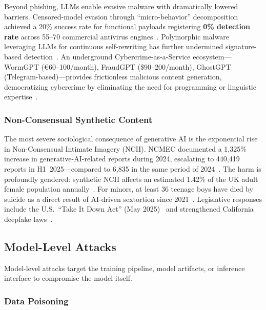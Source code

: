 Beyond phishing, LLMs enable evasive malware with dramatically lowered barriers. Censored-model evasion through ``micro-behavior'' decomposition achieved a 20\% success rate for functional payloads registering \textbf{0\% detection rate} across 55--70 commercial antivirus engines~\cite{mdpi2025malware}. Polymorphic malware leveraging LLMs for continuous self-rewriting has further undermined signature-based detection~\cite{crowdstrike2025ransomware}. An underground Cybercrime-as-a-Service ecosystem---WormGPT (\euro60--100/month), FraudGPT (\$90--200/month), GhostGPT (Telegram-based)---provides frictionless malicious content generation, democratizing cybercrime by eliminating the need for programming or linguistic expertise~\cite{levelblue2023wormgpt,elpaccto2026}.


\subsubsection{Non-Consensual Synthetic Content}
\label{sec:threat-ncii}

The most severe sociological consequence of generative AI is the exponential rise in Non-Consensual Intimate Imagery (NCII). NCMEC documented a 1,325\% increase in generative-AI-related reports during 2024, escalating to 440,419 reports in H1~2025---compared to 6,835 in the same period of 2024~\cite{ncmec2025}. The harm is profoundly gendered: synthetic NCII affects an estimated 1.42\% of the UK adult female population annually~\cite{swgfl2025}. For minors, at least 36 teenage boys have died by suicide as a direct result of AI-driven sextortion since 2021~\cite{ncmec2025}. Legislative responses include the U.S.\ ``Take It Down Act'' (May 2025)~\cite{takeitdown2025} and strengthened California deepfake laws~\cite{calmatters2026deepfake}.


\subsection{Model-Level Attacks}
\label{sec:threat-model}

Model-level attacks target the training pipeline, model artifacts, or inference interface to compromise the model itself.

\subsubsection{Data Poisoning}
\label{sec:threat-poisoning}

